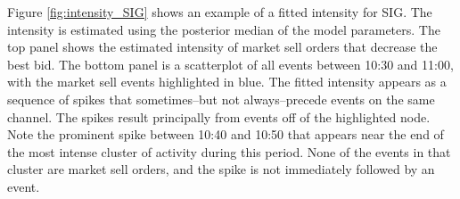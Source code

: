 %
%

Figure \ref{fig:intensity_SIG} shows an example of a fitted intensity for SIG. The intensity is estimated using the posterior median of the model parameters. The top panel shows the estimated intensity of market sell orders that decrease the best bid. The bottom panel is a scatterplot of all events between 10:30 and 11:00, with the market sell events highlighted in blue. The fitted intensity appears as a sequence of spikes that sometimes--but not always--precede events on the same channel. The spikes result principally from events off of the highlighted node. Note the prominent spike between 10:40 and 10:50 that appears near the end of the most intense cluster of activity during this period. None of the events in that cluster are market sell orders, and the spike is not immediately followed by an event.

